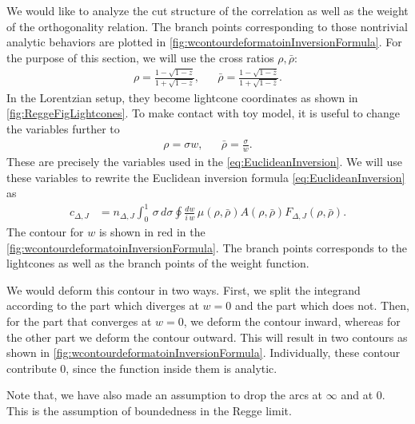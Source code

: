We would like to analyze the cut structure of the correlation as well as the weight of the orthogonality relation.
The branch points corresponding to those nontrivial analytic behaviors are plotted in \cref{fig:wcontourdeformatoinInversionFormula}.
For the purpose of this section, we will use the cross ratios $ \rho, \bar{\rho} $:
\begin{align}
  \rho = \frac{
    1 - \sqrt{1- z}
  }{
    1 + \sqrt{1- z}
  },
   &  &
  \bar{\rho} = \frac{
    1 - \sqrt{1- \bar{z}}
  }{
    1 + \sqrt{1- \bar{z}}
  }
  .\end{align}
In the Lorentzian setup, they become lightcone coordinates as shown in \cref{fig:ReggeFigLightcones}.
To make contact with toy model, it is useful to change the variables further to
\begin{align}
  \rho = \sigma w, &  & \bar{\rho} = \frac{\sigma }{w}
  .\end{align}
These are precisely the variables used in the \cref{eq:EuclideanInversion}.
We will use these variables to rewrite the Euclidean inversion formula \cref{eq:EuclideanInversion} as
\begin{align}
  c_{\Delta,J}
   & = n_{\Delta,J}
  \displaystyle\int_{0}^{1} \, \sigma \, d \sigma  \oint \frac{dw}{i\, w }
  \, \mu\left( \rho,\bar{\rho} \right)
  A\left( \rho, \bar{\rho} \right)  F_{\Delta,J} \left( \rho, \bar{\rho} \right)
  .\end{align}
The contour for $ w $ is shown in red in the \cref{fig:wcontourdeformatoinInversionFormula}.
The branch points corresponds to the lightcones as well as the branch points of the weight function.

We would deform this contour in two ways.
First, we split the integrand according to the part which diverges at $ w = 0 $ and the part which does not.
Then, for the part that converges at $ w = 0 $, we deform the contour inward, whereas for the other part we deform the contour outward.
This will result in two contours as shown in \cref{fig:wcontourdeformatoinInversionFormula}.
Individually, these contour contribute $ 0 $, since the function inside them is analytic.

Note that, we have also made an assumption to drop the arcs at $ \infty $ and at $ 0 $.
This is the assumption of boundedness in the Regge limit.


